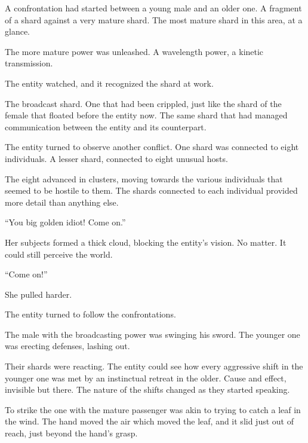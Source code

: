 A confrontation had started between a young male and an older one.  A fragment of a shard against a very mature shard.  The most mature shard in this area, at a glance.



The more mature power was unleashed.  A wavelength power, a kinetic transmission.



The entity watched, and it recognized the shard at work.



The broadcast shard.  One that had been crippled, just like the shard of the female that floated before the entity now.  The same shard that had managed communication between the entity and its counterpart.



The entity turned to observe another conflict.  One shard was connected to eight individuals.  A lesser shard, connected to eight unusual hosts.



The eight advanced in clusters, moving towards the various individuals that seemed to be hostile to them.  The shards connected to each individual provided more detail than anything else.



``You big golden idiot!  Come on.''



Her subjects formed a thick cloud, blocking the entity's vision.  No matter.  It could still perceive the world.



``Come on!''



She pulled harder.



The entity turned to follow the confrontations.



The male with the broadcasting power was swinging his sword.  The younger one was erecting defenses, lashing out.



Their shards were reacting.  The entity could see how every aggressive shift in the younger one was met by an instinctual retreat in the older.  Cause and effect, invisible but there.  The nature of the shifts changed as they started speaking.



To strike the one with the mature passenger was akin to trying to catch a leaf in the wind.  The hand moved the air which moved the leaf, and it slid just out of reach, just beyond the hand's grasp.




